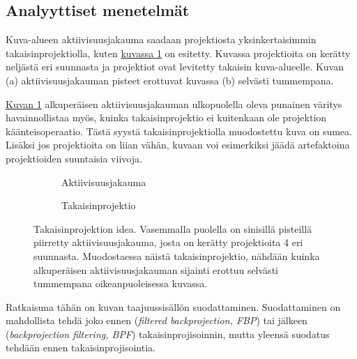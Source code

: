 \subsection{Analyyttiset menetelmät}
Kuva-alueen aktiivisuusjakauma saadaan projektiosta yksinkertaisimmin takaisinprojektiolla, kuten \hyperref[fig:takaisinprojektio]{kuvassa \ref*{fig:takaisinprojektio}} on esitetty. Kuvassa projektioita on kerätty neljästä eri suunnasta ja projektiot ovat levitetty takaisin kuva-alueelle. Kuvan (a) aktiivisuusjakauman pisteet erottuvat kuvassa (b) selvästi tummempana.

\hyperref[fig:takaisinprojektio]{Kuvan \ref*{fig:takaisinprojektio}} alkuperäisen aktiivisuusjakauman ulkopuolella oleva punainen väritys havainnollistaa myös, kuinka takaisinprojektio ei kuitenkaan ole projektion käänteisoperaatio. Tästä syystä takaisinprojektiolla muodostettu kuva on sumea. Lisäksi jos projektioita on liian vähän, kuvaan voi esimerkiksi jäädä artefaktoina projektioiden suuntaisia viivoja.\cite{bruyant_analytic_2002, stiller_basics_2018}

\begin{figure}[H]
    \centering
    \captionsetup{width=.9\textwidth}
    \begin{subfigure}[t]{.4\textwidth}
        \resizebox{\linewidth}{!}{}
        \caption{Aktiivisuusjakauma}
    \end{subfigure}%
    \hspace*{.1\textwidth}
    \begin{subfigure}[t]{.4\textwidth}
        \resizebox{\linewidth}{!}{}
        \caption{Takaisinprojektio}
    \end{subfigure}%
    \caption{Takaisinprojektion idea. Vasemmalla puolella on sinisillä pisteillä piirretty aktiivisuusjakauma, josta on kerätty projektioita 4 eri suunnasta. Muodostaessa näistä takaisinprojektio, nähdään kuinka alkuperäisen aktiivisuusjakauman sijainti erottuu selvästi tummempana oikeanpuoleisessa kuvassa.}
    \label{fig:takaisinprojektio}
\end{figure}

Ratkaisuna tähän on kuvan taajuussisällön suodattaminen\cite{stiller_basics_2018, bruyant_analytic_2002}. Suodattaminen on mahdollista tehdä joko ennen (\textit{filtered backprojection, FBP}) tai jälkeen (\textit{backprojection filtering, BPF}) takaisinprojisoinnin, mutta yleensä suodatus tehdään ennen takaisinprojisointia.\cite{bruyant_analytic_2002}


